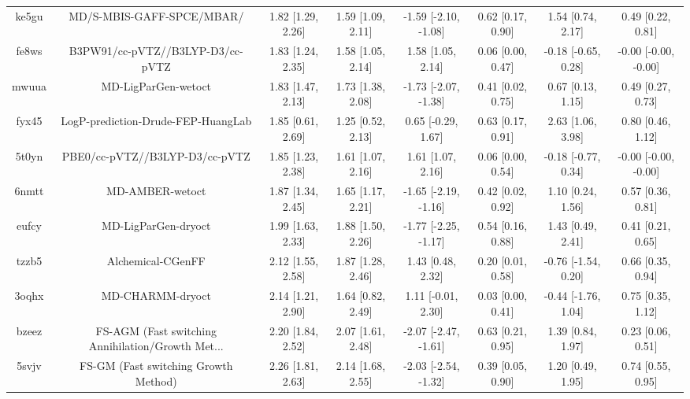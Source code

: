 \documentclass{article}
\begin{document}
\begin{center}
\begin{longtable}{|cccccccc|}
 ke5gu &                          MD/S-MBIS-GAFF-SPCE/MBAR/ &  1.82 [1.29, 2.26] &  1.59 [1.09, 2.11] &  -1.59 [-2.10, -1.08] &  0.62 [0.17, 0.90] &    1.54 [0.74, 2.17] &     0.49 [0.22, 0.81] \\
 fe8ws &                   B3PW91/cc-pVTZ//B3LYP-D3/cc-pVTZ &  1.83 [1.24, 2.35] &  1.58 [1.05, 2.14] &     1.58 [1.05, 2.14] &  0.06 [0.00, 0.47] &  -0.18 [-0.65, 0.28] &  -0.00 [-0.00, -0.00] \\
 mwuua &                                MD-LigParGen-wetoct &  1.83 [1.47, 2.13] &  1.73 [1.38, 2.08] &  -1.73 [-2.07, -1.38] &  0.41 [0.02, 0.75] &    0.67 [0.13, 1.15] &     0.49 [0.27, 0.73] \\
 fyx45 &                 LogP-prediction-Drude-FEP-HuangLab &  1.85 [0.61, 2.69] &  1.25 [0.52, 2.13] &    0.65 [-0.29, 1.67] &  0.63 [0.17, 0.91] &    2.63 [1.06, 3.98] &     0.80 [0.46, 1.12] \\
 5t0yn &                     PBE0/cc-pVTZ//B3LYP-D3/cc-pVTZ &  1.85 [1.23, 2.38] &  1.61 [1.07, 2.16] &     1.61 [1.07, 2.16] &  0.06 [0.00, 0.54] &  -0.18 [-0.77, 0.34] &  -0.00 [-0.00, -0.00] \\
 6nmtt &                                    MD-AMBER-wetoct &  1.87 [1.34, 2.45] &  1.65 [1.17, 2.21] &  -1.65 [-2.19, -1.16] &  0.42 [0.02, 0.92] &    1.10 [0.24, 1.56] &     0.57 [0.36, 0.81] \\
 eufcy &                                MD-LigParGen-dryoct &  1.99 [1.63, 2.33] &  1.88 [1.50, 2.26] &  -1.77 [-2.25, -1.17] &  0.54 [0.16, 0.88] &    1.43 [0.49, 2.41] &     0.41 [0.21, 0.65] \\
 tzzb5 &                                  Alchemical-CGenFF &  2.12 [1.55, 2.58] &  1.87 [1.28, 2.46] &     1.43 [0.48, 2.32] &  0.20 [0.01, 0.58] &  -0.76 [-1.54, 0.20] &     0.66 [0.35, 0.94] \\
 3oqhx &                                   MD-CHARMM-dryoct &  2.14 [1.21, 2.90] &  1.64 [0.82, 2.49] &    1.11 [-0.01, 2.30] &  0.03 [0.00, 0.41] &  -0.44 [-1.76, 1.04] &     0.75 [0.35, 1.12] \\
 bzeez &  FS-AGM (Fast switching Annihilation/Growth Met... &  2.20 [1.84, 2.52] &  2.07 [1.61, 2.48] &  -2.07 [-2.47, -1.61] &  0.63 [0.21, 0.95] &    1.39 [0.84, 1.97] &     0.23 [0.06, 0.51] \\
 5svjv &               FS-GM (Fast switching Growth Method) &  2.26 [1.81, 2.63] &  2.14 [1.68, 2.55] &  -2.03 [-2.54, -1.32] &  0.39 [0.05, 0.90] &    1.20 [0.49, 1.95] &     0.74 [0.55, 0.95] \\

\end{longtable}
\end{center}
\end{document}
